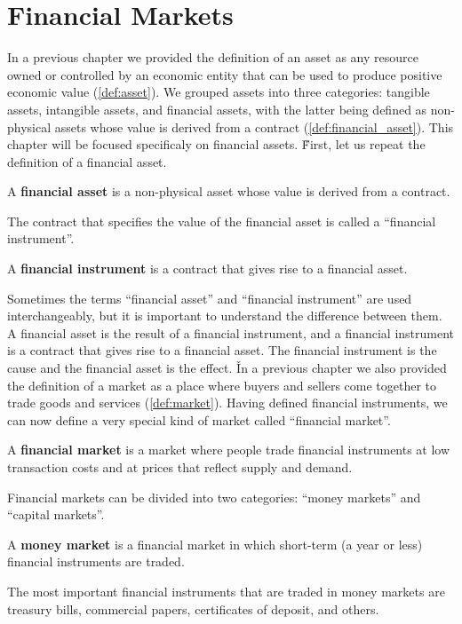 \section{Financial Markets}

In a previous chapter we provided the definition of an asset as any resource owned or controlled by an economic entity
that can be used to produce positive economic value (\ref{def:asset}). We grouped assets into three categories:
tangible assets, intangible assets, and financial assets, with the latter being defined as non-physical assets whose
value is derived from a contract (\ref{def:financial_asset}). This chapter will be focused specificaly on financial
assets. \v

First, let us repeat the definition of a financial asset.

A \textbf{financial asset} is a non-physical asset whose value is derived from a contract.
\ed

The contract that specifies the value of the financial asset is called a ``financial instrument''.

A \textbf{financial instrument} is a contract that gives rise to a financial asset.
\ed

Sometimes the terms ``financial asset'' and ``financial instrument'' are used interchangeably, but it is important to
understand the difference between them. A financial asset is the result of a financial instrument, and a financial
instrument is a contract that gives rise to a financial asset. The financial instrument is the cause and the financial
asset is the effect. \v

In a previous chapter we also provided the definition of a market as a place where buyers and sellers come together to
trade goods and services (\ref{def:market}). Having defined financial instruments, we can now define a very special kind
of market called ``financial market''.

A \textbf{financial market} is a market where people trade financial instruments at low transaction costs and at prices
that reflect supply and demand.
\ed

Financial markets can be divided into two categories: ``money markets'' and ``capital markets''.

A \textbf{money market} is a financial market in which short-term (a year or less) financial instruments are traded.
\ed

The most important financial instruments that are traded in money markets are treasury bills, commercial papers,
certificates of deposit, and others.


